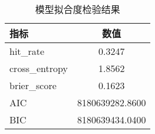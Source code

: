 \begin{table}[htbp]
\centering
\caption{模型拟合度检验结果}
\begin{tabular}{lc}
\toprule
指标 & 数值 \\
\midrule
hit_rate & 0.3247 \\
cross_entropy & 1.8562 \\
brier_score & 0.1623 \\
AIC & 8180639282.8600 \\
BIC & 8180639434.0400 \\
\bottomrule
\end{tabular}
\end{table}
